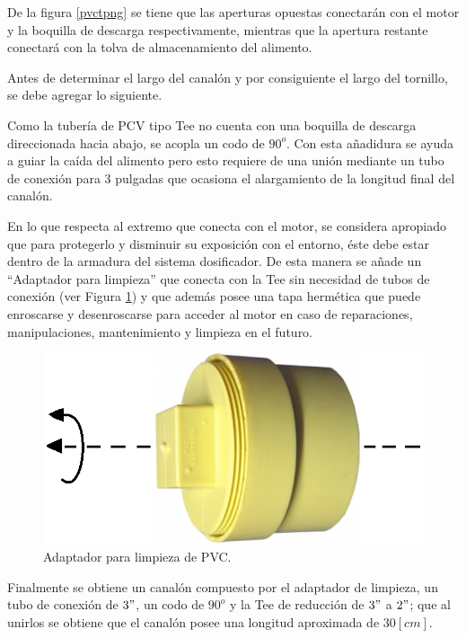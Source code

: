 \begin{enumerate}[(1)]
	De la figura \ref{pvctpng} se tiene que las aperturas opuestas conectarán con el motor y la boquilla de descarga respectivamente, mientras que la apertura restante conectará con la tolva de almacenamiento del alimento. 
	
	Antes de determinar el largo del canalón y por consiguiente el largo del tornillo, se debe agregar lo siguiente.
	
	Como la tubería de PCV tipo Tee no cuenta con una boquilla de descarga direccionada hacia abajo, se acopla un codo de ${90}^o$. Con esta añadidura se ayuda a guiar la caída del alimento pero esto requiere de una unión mediante un tubo de conexión para 3 pulgadas que ocasiona el alargamiento de la longitud final del canalón. 
	
	En lo que respecta al extremo que conecta con el motor, se considera apropiado que para protegerlo y disminuir su exposición con el entorno, éste debe estar dentro de la armadura del sistema dosificador. De esta manera se añade un ``Adaptador para limpieza'' que conecta con la Tee sin necesidad de tubos de conexión (ver Figura \ref{adaptador3ppng}) y que además posee una tapa hermética que puede enroscarse y desenroscarse para acceder al motor en caso de reparaciones, manipulaciones, mantenimiento y limpieza en el futuro.
	
	\begin{figure}[H]
	    \begin{center}
	    	\includegraphics[scale=0.45]{img/adaptador3p.png}
        \end{center}
	    \caption{Adaptador para limpieza de PVC. \label{adaptador3ppng}}
    \end{figure}
	
	\pagebreak
    Finalmente se obtiene un canalón  compuesto  por el adaptador de limpieza, un tubo de conexión de $3"$, un codo de ${90}^o$ y la Tee de reducción de $3"$ a $2"$; que al unirlos  se obtiene que el canalón posee una longitud aproximada de $30 [cm]$.
    

\end{enumerate}
